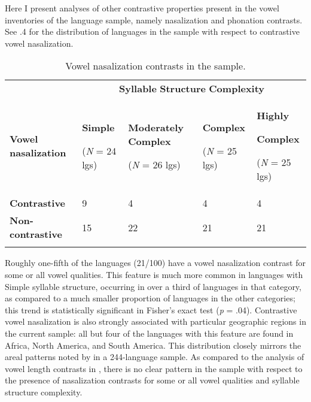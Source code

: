   Here I present analyses of other contrastive properties present in the vowel inventories of the language sample, namely nasalization and phonation contrasts. See .4 for the distribution of languages in the sample with respect to contrastive vowel nasalization.






\begin{table}
\begin{tabularx}{\textwidth}{XXXXX}
 & \multicolumn{4}{c}{ \textbf{Syllable} \textbf{Structure} \textbf{Complexity}}\\
\lsptoprule
\textbf{Vowel} \textbf{nasalization} & { \textbf{Simple}}

 (\textit{N} = 24 lgs) & { \textbf{Moderately} \textbf{Complex}}

 (\textit{N} = 26 lgs) & { \textbf{Complex}}

 (\textit{N} = 25 lgs) & { \textbf{Highly} }

{ \textbf{Complex}}

 (\textit{N} = 25 lgs)\\
\textbf{Contrastive} & 9 & 4 & 4 & 4\\
\textbf{Non-contrastive} & 15 & 22 & 21 & 21\\
\lspbottomrule
\end{tabularx}
\caption{\label{4.4}Vowel nasalization contrasts in the sample.}
\end{table}




  Roughly one-fifth of the languages (21/100) have a vowel nasalization contrast for some or all vowel qualities. This feature is much more common in languages with Simple syllable structure, occurring in over a third of languages in that category, as compared to a much smaller proportion of languages in the other categories; this trend is statistically significant in Fisher’s exact test (\textit{p} = .04). Contrastive vowel nasalization is also strongly associated with particular geographic regions in the current sample: all but four of the languages with this feature are found in Africa, North America, and South America. This distribution closely mirrors the areal patterns noted by \citet{Hajek2013} in a 244-language sample. As compared to the analysis of vowel length contrasts in , there is no clear pattern in the sample with respect to the presence of nasalization contrasts for some or all vowel qualities and syllable structure complexity.



